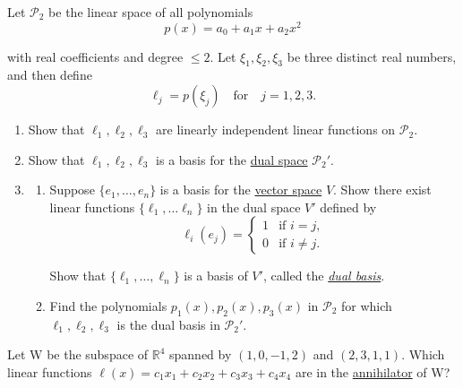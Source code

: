   \begin{exercise}[Lax 2.6] 
    Let $\mathcal{P}_2$ be the linear space of all polynomials
    \begin{equation}
      p(x) = a_0 + a_1x + a_2x^2
    \end{equation}
    
    with real coefficients and degree $\leq 2$. Let $\xi_1, \xi_2, \xi_3$ be three distinct real numbers, and then define
    \begin{equation}
      \ell_j = p(\xi_j) \quad \text{for} \quad j = 1,2,3.
    \end{equation}
    
    \begin{enumerate}
      \item[(a)] Show that $\ell_1, \ell_2, \ell_3$ are linearly independent linear functions on $\mathcal{P}_2$.
      \item[(b)] Show that $\ell_1, \ell_2, \ell_3$ is a basis for the \hyperref[def:dual-space]{dual space} $\mathcal{P}_2'$.
      \item[(c)] 
        \begin{enumerate}
          \item[(1)] Suppose $\{e_1, \ldots, e_n\}$ is a basis for the \hyperref[def:vector-space]{vector space} $V$. Show there exist linear functions $\{\ell_1, \ldots \ell_n\}$ in the dual space $V'$ defined by
          \begin{equation}
            \ell_i(e_j) = \begin{cases} 1 & \text{if } i = j, \\ 0 & \text{if } i \neq j. \end{cases}
          \end{equation}
        
          Show that $\{\ell_1, \ldots, \ell_n\}$ is a basis of $V'$, called the \textit{\hyperref[def:dual-basis]{dual basis}}.
          \item[(2)] Find the polynomials $p_1(x), p_2(x), p_3(x)$ in $\mathcal{P}_2$ for which $\ell_1, \ell_2, \ell_3$ is the dual basis in $\mathcal{P}_2'$.
        \end{enumerate}
    \end{enumerate}
  \end{exercise}

  \begin{exercise}[Lax 2.7] 
    Let W be the subspace of $\mathbb{R}^4$ spanned by $(1, 0, -1, 2)$ and $(2, 3, 1, 1)$.
    Which linear functions $\ell(x) = c_1x_1 + c_2x_2 + c_3x_3 + c_4x_4$ are in the \hyperref[def:annihilator]{annihilator} of W?
  \end{exercise}

